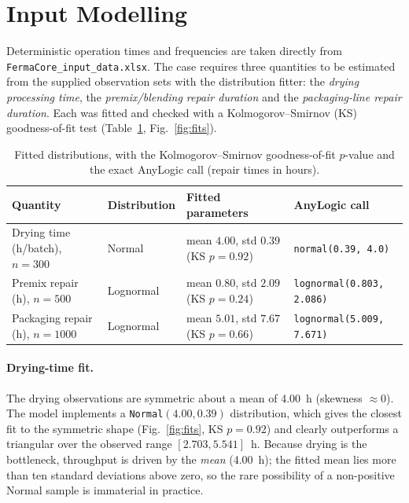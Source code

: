 \section{Input Modelling}
\label{sec:input}

Deterministic operation times and frequencies are taken directly from
\texttt{FermaCore\_input\_data.xlsx}. The case requires three quantities to be
estimated from the supplied observation sets with the distribution fitter: the
\emph{drying processing time}, the \emph{premix/blending repair duration} and
the \emph{packaging-line repair duration}. Each was fitted and checked with a
Kolmogorov--Smirnov (KS) goodness-of-fit test (Table~\ref{tab:fits},
Fig.~\ref{fig:fits}).

\begin{table}[H]
\centering
\caption{Fitted distributions, with the Kolmogorov--Smirnov goodness-of-fit
$p$-value and the exact AnyLogic call (repair times in hours).}
\label{tab:fits}
\begin{tabularx}{\textwidth}{l l l X}
\toprule
\textbf{Quantity} & \textbf{Distribution} & \textbf{Fitted parameters} & \textbf{AnyLogic call} \\
\midrule
Drying time (h/batch), $n{=}300$      & Normal & mean $4.00$, std $0.39$ (KS $p=0.92$) & \texttt{normal(0.39, 4.0)} \\
Premix repair (h), $n{=}500$          & Lognormal  & mean $0.80$, std $2.09$ (KS $p=0.24$) & \texttt{lognormal(0.803, 2.086)} \\
Packaging repair (h), $n{=}1000$      & Lognormal  & mean $5.01$, std $7.67$ (KS $p=0.66$) & \texttt{lognormal(5.009, 7.671)} \\
\bottomrule
\end{tabularx}
\end{table}

\paragraph{Drying-time fit.} The drying observations are symmetric about a mean
of \SI{4.00}{h} (skewness $\approx 0$). The model implements a
\texttt{Normal}$(4.00,0.39)$ distribution, which gives the closest fit to the
symmetric shape (Fig.~\ref{fig:fits}, KS $p=0.92$) and clearly outperforms a
triangular over the observed range $[2.703,5.541]$~h. Because drying is the
bottleneck, throughput is driven by the \emph{mean} (\SI{4.00}{h}); the fitted
mean lies more than ten standard deviations above zero, so the rare possibility
of a non-positive Normal sample is immaterial in practice.

